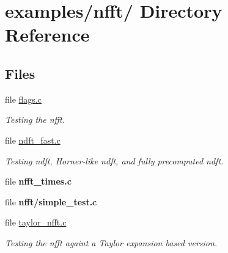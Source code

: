 \hypertarget{dir_000018}{
\section{examples/nfft/ Directory Reference}
\label{dir_000018}
}
\subsection*{Files}
\begin{CompactItemize}
\item 
file \hyperlink{flags_8c}{flags.c}
\begin{CompactList}\small\item\em Testing the nfft. \item\end{CompactList}

\item 
file \hyperlink{ndft__fast_8c}{ndft\_\-fast.c}
\begin{CompactList}\small\item\em Testing ndft, Horner-like ndft, and fully precomputed ndft. \item\end{CompactList}

\item 
file {\bf nfft\_\-times.c}
\item 
file {\bf nfft/simple\_\-test.c}
\item 
file \hyperlink{taylor__nfft_8c}{taylor\_\-nfft.c}
\begin{CompactList}\small\item\em Testing the nfft againt a Taylor expansion based version. \item\end{CompactList}

\end{CompactItemize}
